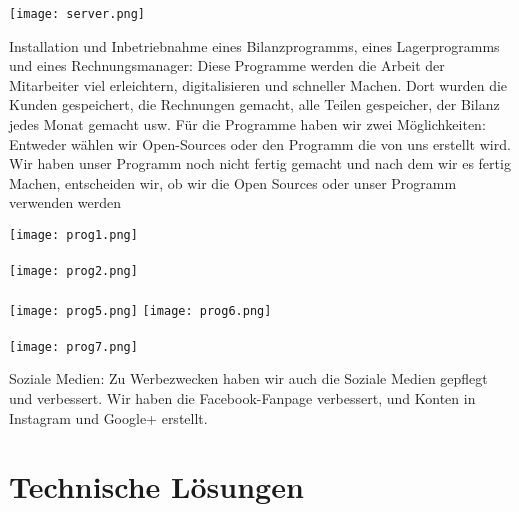 \texttt{[image: server.png]}

Installation und Inbetriebnahme eines Bilanzprogramms, eines Lagerprogramms und eines Rechnungsmanager:
Diese Programme werden die Arbeit der Mitarbeiter viel erleichtern, digitalisieren und schneller Machen. Dort wurden die Kunden gespeichert, die Rechnungen gemacht, alle Teilen gespeicher, der Bilanz jedes Monat gemacht usw. F\"ur die Programme haben wir zwei M\"oglichkeiten: Entweder w\"ahlen wir Open-Sources oder den Programm die von uns erstellt wird. Wir haben unser Programm noch nicht fertig gemacht und nach dem wir es fertig Machen, entscheiden wir, ob wir die Open Sources oder unser Programm verwenden werden

\texttt{[image: prog1.png]} \\
\\
\texttt{[image: prog2.png]} \\
\\
\texttt{[image: prog5.png]}
\texttt{[image: prog6.png]} \\
\\
\texttt{[image: prog7.png]} 

Soziale Medien:
Zu Werbezwecken haben wir auch die Soziale Medien gepflegt und verbessert. Wir haben die Facebook-Fanpage verbessert, und Konten in Instagram und Google+ erstellt.

\section{Technische L\"osungen}

